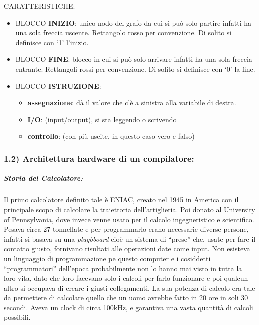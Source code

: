 \documentclass[
  paper=a4,
  oneside  ,captions=tableheading
]{scrbook}
\providecommand{\tightlist}{%
  \setlength{\itemsep}{0pt}\setlength{\parskip}{0pt}}
\begin{document}
CARATTERISTICHE:

\begin{itemize}
\tightlist
\item
  BLOCCO \textbf{INIZIO}: unico nodo del grafo da cui si può solo
  partire infatti ha una sola freccia uscente. Rettangolo rosso per
  convenzione. Di solito si definisce con `1' l'inizio.
\item
  BLOCCO \textbf{FINE}: blocco in cui si può solo arrivare infatti ha
  una sola freccia entrante. Rettangoli rossi per convenzione. Di solito
  si definisce con `0' la fine.
\item
  BLOCCO \textbf{ISTRUZIONE}:

  \begin{itemize}
  \tightlist
  \item
    \textbf{assegnazione}: dà il valore che c'è a sinistra alla
    variabile di destra.
  \item
    \textbf{I/O}: (input/output), si sta leggendo o scrivendo
  \item
    \textbf{controllo}: (con più uscite, in questo caso vero e falso)
  \end{itemize}
\end{itemize}

\hypertarget{architettura-hardware-di-un-compilatore}{%
\subsubsection{1.2) Architettura hardware di un
compilatore:}\label{architettura-hardware-di-un-compilatore}}

\hypertarget{storia-del-calcolatore}{%
\subparagraph{Storia del Calcolatore:}\label{storia-del-calcolatore}}

Il primo calcolatore definito tale è ENIAC, creato nel 1945 in America
con il principale scopo di calcolare la traiettoria dell'artiglieria.
Poi donato al University of Pennsylvania, dove invece venne usato per il
calcolo ingegneristico e scientifico. Pesava circa 27 tonnellate e per
programmarlo erano necessarie diverse persone, infatti si basava su una
\emph{plugbboard} cioè un sistema di ``prese'' che, usate per fare il
contatto giusto, fornivano risultati alle operazioni date come input.
Non esisteva un linguaggio di programmazione pe questo computer e i
cosiddetti ``programmatori'' dell'epoca probabilmente non lo hanno mai
visto in tutta la loro vita, dato che loro facevano solo i calcoli per
farlo funzionare e poi qualcun altro si occupava di creare i giusti
collegamenti. La sua potenza di calcolo era tale da permettere di
calcolare quello che un uomo avrebbe fatto in 20 ore in soli 30 secondi.
Aveva un clock di circa 100kHz, e garantiva una vasta quantità di
calcoli possibili.
\end{document}
